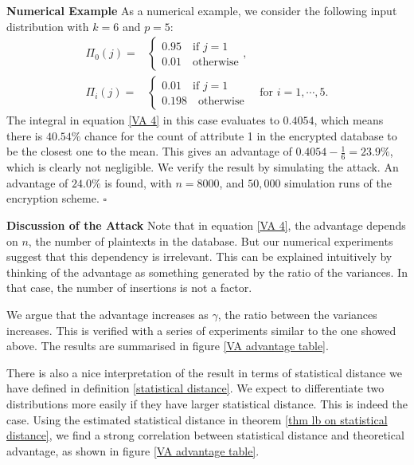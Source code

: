 \textbf{Numerical Example} As a numerical example, we consider the following input distribution with $k = 6$ and $p = 5$:
\begin{align*}
	\Pi_0(j) = & \begin{cases*}
				   0.95 \quad \text{if } j = 1 \\
				   0.01 \quad \text{otherwise}
		  	     \end{cases*}, \\
	\Pi_i(j) = & \begin{cases*}
				   0.01 \quad \text{if } j = 1 \\
				   0.198 \quad \text{otherwise}
				 \end{cases*} \quad \text{for } i = 1, \cdots,5. 
\end{align*}
The integral in equation \ref{VA 4} in this case evaluates to $0.4054$, which means there is $40.54\%$ chance for the count of attribute 1 in the encrypted database to be the closest one to the mean. This gives an advantage of $0.4054 - \frac{1}{6} = 23.9\%$, which is clearly not negligible. We verify the result by simulating the attack. An advantage of $24.0\%$ is found, with $n = 8000$, and $50,000$ simulation runs of the encryption scheme. $\square$




\textbf{Discussion of the Attack} Note that in equation \ref{VA 4}, the advantage depends on $n$, the number of plaintexts in the database. But our numerical experiments suggest that this dependency is irrelevant. This can be explained intuitively by thinking of the advantage as something generated by the ratio of the variances. In that case, the number of insertions is not a factor.

We argue that the advantage increases as $\gamma$, the ratio between the variances increases. This is verified with a series of experiments similar to the one showed above. The results are summarised in figure \ref{VA advantage table}.

There is also a nice interpretation of the result in terms of statistical distance we have defined in definition \ref{statistical distance}. We expect to differentiate two distributions more easily if they have larger statistical distance. This is indeed the case. Using the estimated statistical distance in theorem \ref{thm lb on statistical distance}, we find a strong correlation between statistical distance and theoretical advantage, as shown in figure \ref{VA advantage table}.

